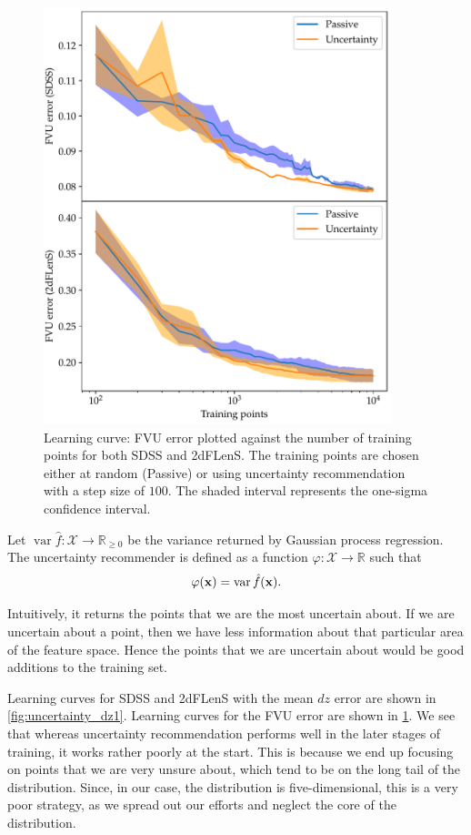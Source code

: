 \documentclass[11pt,twoside,openright]{report}
\newcommand\bbR{\mathbb{R}}
\newcommand\bx{\mathbf{x}}
\newcommand\cX{\mathcal{X}}
\DeclareMathOperator{\var}{var}
\begin{document}
  \begin{figure}
    \centering
    \includegraphics[width=0.9\textwidth]{uncertainty_fvu1.pdf}
    \caption{Learning curve: FVU error plotted against the number of training points for both SDSS and 2dFLenS. The training points are chosen either at random (Passive) or using uncertainty recommendation with a step size of $100$. The shaded interval represents the one-sigma confidence interval.}
    \label{fig:uncertainty_fvu1}
  \end{figure}

Let $\var\hat f : \cX \to \bbR_{\geq0}$ be the variance returned by Gaussian process regression. The uncertainty recommender is defined as a function $\varphi : \cX \to \bbR$ such that \[
    \varphi(\bx) = \var\hat f(\bx) \text.
\]

Intuitively, it returns the points that we are the most uncertain about. If we are uncertain about a point, then we have less information about that particular area of the feature space. Hence the points that we are uncertain about would be good additions to the training set.

Learning curves for SDSS and 2dFLenS with the mean $dz$ error are shown in \cref{fig:uncertainty_dz1}. Learning curves for the FVU error are shown in \cref{fig:uncertainty_fvu1}. We see that whereas uncertainty recommendation performs well in the later stages of training, it works rather poorly at the start. This is because we end up focusing on points that we are very unsure about, which tend to be on the long tail of the distribution. Since, in our case, the distribution is five-dimensional, this is a very poor strategy, as we spread out our efforts and neglect the core of the distribution.
\end{document}
